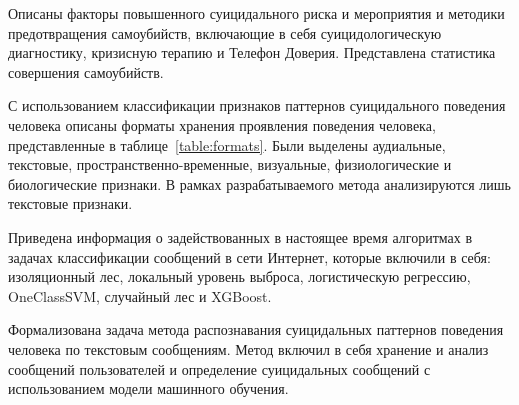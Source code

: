 Описаны факторы повышенного суицидального риска и мероприятия и методики предотвращения самоубийств, включающие в себя суицидологическую диагностику, кризисную терапию и Телефон Доверия.
Представлена статистика совершения самоубийств.

С использованием классификации признаков паттернов суицидального поведения человека описаны форматы хранения проявления поведения человека, представленные в таблице~\ref{table:formats}. 
Были выделены аудиальные, текстовые, пространственно-временные, визуальные, физиологические и биологические признаки.
В рамках разрабатываемого метода анализируются лишь текстовые признаки.

Приведена информация о задействованных в настоящее время алгоритмах в задачах классификации сообщений в сети Интернет, которые включили в себя: изоляционный лес, локальный уровень выброса, логистическую регрессию, OneClassSVM, случайный лес и XGBoost.

Формализована задача метода распознавания суицидальных паттернов поведения человека по текстовым сообщениям. Метод включил в себя хранение и анализ сообщений пользователей и определение суицидальных сообщений с использованием модели машинного обучения.

